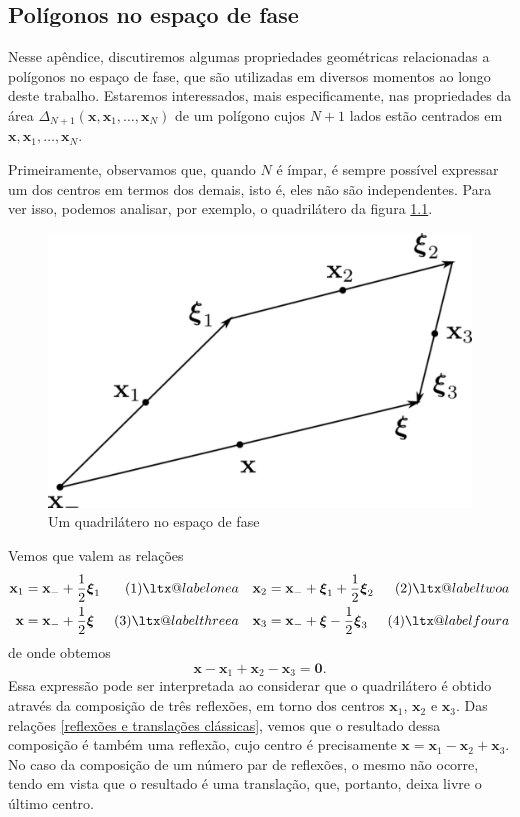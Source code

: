 \documentclass[
	12pt,
	oneside,			%
	a4paper,			%
	english,			%
	brazil				%
	]{abntex2}
\makeatletter
\theoremstyle{definition}
\newcommand\Label[1]{&\refstepcounter{equation}(\theequation)\ltx@label{#1}&}
\makeatother
\begin{document}
\begin{apendicesenv}

\chapter{Polígonos no espaço de fase}
\label{apendice_area}

Nesse apêndice, discutiremos algumas propriedades geométricas relacionadas a polígonos no espaço de fase, que são utilizadas em diversos momentos ao longo deste trabalho. Estaremos interessados, mais especificamente, nas propriedades da área $\Delta_{N+1}\left(\mathbf{x},\mathbf{x}_1,\ldots,\mathbf{x}_{N}\right)$ de um polígono cujos $N+1$ lados estão centrados em $\mathbf{x},\mathbf{x}_1,\ldots,\mathbf{x}_{N}$.

Primeiramente, observamos que, quando $N$ é ímpar, é sempre possível expressar um dos centros em termos dos demais, isto é, eles não são independentes. Para ver isso, podemos analisar, por exemplo, o quadrilátero da figura \ref{quadrilatero}.
\begin{figure}[H]
    \includegraphics[width=.6\textwidth]{Imagens/quadrilatero.png}
    \centering
    \caption{Um quadrilátero no espaço de fase}
    \label{quadrilatero}
\end{figure}

Vemos que valem as relações
\begin{align*}
     \mathbf{x}_1 &= \mathbf{x}_- + \frac{1}{2}\boldsymbol{\xi}_1 \Label{onea}& \mathbf{x}_{2}&= \mathbf{x}_- + \boldsymbol{\xi}_1 + \frac{1}{2}\boldsymbol{\xi}_2 \Label{twoa}\\
     \mathbf{x} &= \mathbf{x}_- + \frac{1}{2}\boldsymbol{\xi} \Label{threea}& \mathbf{x}_{3}&=\mathbf{x}_- + \boldsymbol{\xi} - \frac{1}{2}\boldsymbol{\xi}_3 \Label{foura}
\end{align*}
de onde obtemos
\begin{equation}
\label{relação paralelogramo}
    \mathbf{x} - \mathbf{x}_1 + \mathbf{x}_2 - \mathbf{x}_3 = \boldsymbol{0}.
\end{equation}
Essa expressão pode ser interpretada ao considerar que o quadrilátero é obtido através da composição de três reflexões, em torno dos centros $\mathbf{x}_1$, $\mathbf{x}_2$ e $\mathbf{x}_3$. Das relações \eqref{reflexões e translações clássicas}, vemos que o resultado dessa composição é também uma reflexão, cujo centro é precisamente $\mathbf{x} = \mathbf{x}_1 - \mathbf{x}_2 + \mathbf{x}_3$. No caso da composição de um número par de reflexões, o mesmo não ocorre, tendo em vista que o resultado é uma translação, que, portanto, deixa livre o último centro.


\end{apendicesenv}
\end{document}
